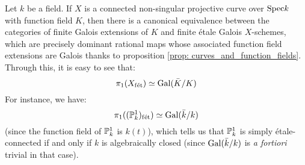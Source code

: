             \begin{example} \label{example: etale_fundamental_group_of_a_curve}
                Let $k$ be a field. If $X$ is a connected non-singular projective curve over $\Spec k$ with function field $K$, then there is a canonical equivalence between the categories of finite Galois extensions of $K$ and finite \'etale Galois $X$-schemes, which are precisely dominant rational maps whose associated function field extensions are Galois thanks to proposition \ref{prop: curves_and_function_fields}. Through this, it is easy to see that:
                    $$\pi_1(X_{\fet}) \cong \Gal(\bar{K}/K)$$
                For instance, we have:
                    $$\pi_1((\P^1_k)_{\fet}) \cong \Gal(\bar{k}/k)$$
                (since the function field of $\P^1_k$ is $k(t)$), which tells us that $\P^1_k$ is simply \'etale-connected if and only if $k$ is algebraically closed (since $\Gal(\bar{k}/k)$ is \textit{a fortiori} trivial in that case). 
            \end{example}
        
